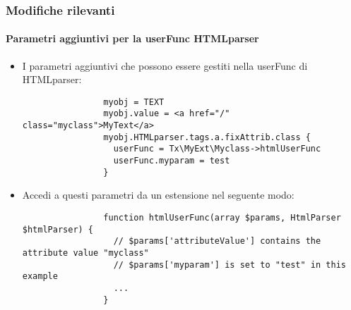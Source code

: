 \begin{frame}[fragile]
	\frametitle{Modifiche rilevanti}
	\framesubtitle{Parametri aggiuntivi per la userFunc HTMLparser}

	\lstset{basicstyle=\tiny\ttfamily}

	\begin{itemize}

		\item I parametri aggiuntivi che possono essere gestiti nella userFunc di HTMLparser:

			\begin{lstlisting}
				myobj = TEXT
				myobj.value = <a href="/" class="myclass">MyText</a>
				myobj.HTMLparser.tags.a.fixAttrib.class {
				  userFunc = Tx\MyExt\Myclass->htmlUserFunc
				  userFunc.myparam = test
				}
			\end{lstlisting}

		\item Accedi a questi parametri da un estensione nel seguente modo:

			\begin{lstlisting}
				function htmlUserFunc(array $params, HtmlParser $htmlParser) {
				  // $params['attributeValue'] contains the attribute value "myclass"
				  // $params['myparam'] is set to "test" in this example
				  ...
				}
			\end{lstlisting}

	\end{itemize}

\end{frame}

